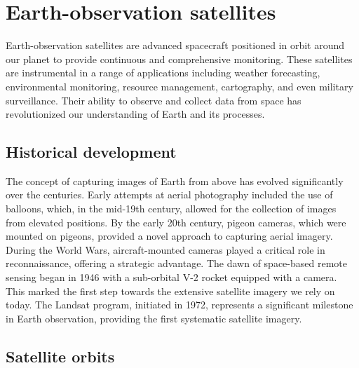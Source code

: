 \documentclass[
  12 pt,
]{Nemilov}
\begin{document}
\section{Earth-observation satellites}\label{earth-observation-satellites}

Earth-observation satellites are advanced spacecraft positioned in orbit around our planet to provide continuous and comprehensive monitoring. These satellites are instrumental in a range of applications including weather forecasting, environmental monitoring, resource management, cartography, and even military surveillance. Their ability to observe and collect data from space has revolutionized our understanding of Earth and its processes.

\subsection{Historical development}\label{historical-development}

The concept of capturing images of Earth from above has evolved significantly over the centuries. Early attempts at aerial photography included the use of balloons, which, in the mid-19th century, allowed for the collection of images from elevated positions. By the early 20th century, pigeon cameras, which were mounted on pigeons, provided a novel approach to capturing aerial imagery. During the World Wars, aircraft-mounted cameras played a critical role in reconnaissance, offering a strategic advantage. The dawn of space-based remote sensing began in 1946 with a sub-orbital V-2 rocket equipped with a camera. This marked the first step towards the extensive satellite imagery we rely on today. The Landsat program, initiated in 1972, represents a significant milestone in Earth observation, providing the first systematic satellite imagery.

\subsection{Satellite orbits}\label{satellite-orbits}
\end{document}
